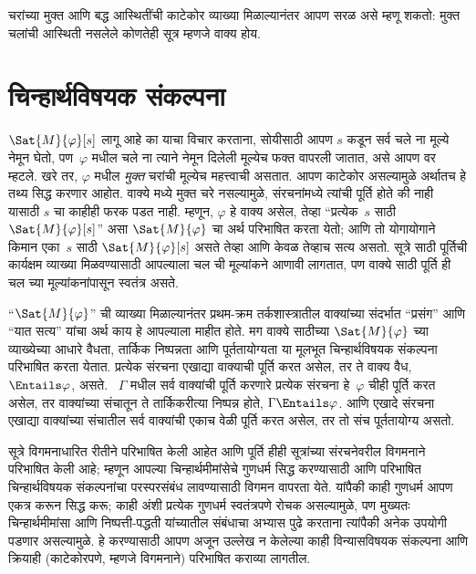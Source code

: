 चरांच्या मुक्त आणि बद्ध आस्थितींची काटेकोर व्याख्या मिळाल्यानंतर आपण
सरळ असे म्हणू शकतो: मुक्त चलांची आस्थिती नसलेले कोणतेही
सूत्र म्हणजे वाक्य होय.












\section{चिन्हार्थविषयक संकल्पना}\label{fol:int:sem:sec}

$\Sat{M}{\varphi}[s]$ लागू आहे का याचा विचार करताना, सोयीसाठी आपण $s$ कडून
सर्व चले ना मूल्ये नेमून घेतो, पण~$\varphi$ मधील चले ना
त्याने नेमून दिलेली मूल्येच फक्त वापरली जातात, असे आपण वर म्हटले.
खरे तर, $\varphi$ मधील \emph{मुक्त} चरांची मूल्येच महत्त्वाची असतात. आपण
काटेकोर असल्यामुळे अर्थातच हे तथ्य सिद्ध करणार आहोत. वाक्ये मध्ये
मुक्त चरे नसल्यामुळे, संरचनांमध्ये त्यांची पूर्ति होते की नाही
यासाठी $s$ चा काहीही फरक पडत नाही. म्हणून, $\varphi$ हे वाक्य असेल,
तेव्हा ``प्रत्येक~$s$ साठी $\Sat{M}{\varphi}[s]$'' असा $\Sat{M}{\varphi}$ चा अर्थ
परिभाषित करता येतो; आणि तो योगायोगाने किमान एका~$s$ साठी
$\Sat{M}{\varphi}[s]$ असते तेव्हा आणि केवळ तेव्हाच सत्य असतो. सूत्रे
साठी पूर्तिची कार्यक्षम व्याख्या मिळवण्यासाठी आपल्याला चल ची
मूल्यांकने आणावी लागतात, पण वाक्ये साठी पूर्ति ही चल
च्या मूल्यांकनांपासून स्वतंत्र असते.

``$\Sat{M}{\varphi}$'' ची व्याख्या मिळाल्यानंतर प्रथम-क्रम तर्कशास्त्रातील
वाक्यांच्या संदर्भात ``प्रसंग'' आणि ``यात सत्य'' यांचा अर्थ काय
हे आपल्याला माहीत होते. मग वाक्ये साठीच्या $\Sat{M}{\varphi}$ च्या
व्याख्येच्या आधारे वैधता, तार्किक निष्पन्नता आणि पूर्ततायोग्यता या मूलभूत
चिन्हार्थविषयक संकल्पना परिभाषित करता येतात. प्रत्येक संरचना
एखाद्या वाक्याची पूर्ति करत असेल, तर ते वाक्य वैध, $\Entails \varphi$, असते.
~$\Gamma$ मधील सर्व वाक्यांची पूर्ति करणारे प्रत्येक
संरचना हे~$\varphi$ चीही पूर्ति करत असेल, तर वाक्यांच्या संचातून
ते तार्किकरीत्या निष्पन्न होते, $\Gamma \Entails \varphi$. आणि एखादे
संरचना एखाद्या वाक्यांच्या संचातील सर्व वाक्यांची एकाच
वेळी पूर्ति करत असेल, तर तो संच पूर्ततायोग्य असतो.

सूत्रे विगमनाधारित रीतीने परिभाषित केली आहेत आणि पूर्ति हीही
सूत्रांच्या संरचनेवरील विगमनाने परिभाषित केली आहे; म्हणून आपल्या
चिन्हार्थमीमांसेचे गुणधर्म सिद्ध करण्यासाठी आणि परिभाषित
चिन्हार्थविषयक संकल्पनांचा परस्परसंबंध लावण्यासाठी विगमन वापरता येते.
यांपैकी काही गुणधर्म आपण एकत्र करून सिद्ध करू; काही अंशी प्रत्येक
गुणधर्म स्वतंत्रपणे रोचक असल्यामुळे, पण मुख्यतः चिन्हार्थमीमांसा आणि
निष्पत्ती-पद्धती यांच्यातील संबंधाचा अभ्यास पुढे करताना त्यांपैकी
अनेक उपयोगी पडणार असल्यामुळे. हे करण्यासाठी आपण अजून उल्लेख न केलेल्या
काही विन्यासविषयक संकल्पना आणि क्रियाही (काटेकोरपणे, म्हणजे विगमनाने)
परिभाषित कराव्या लागतील.












